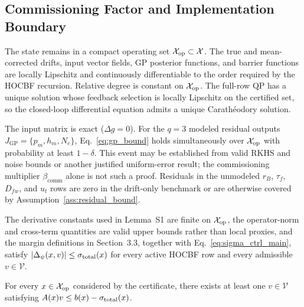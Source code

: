 \subsection{Commissioning Factor and Implementation Boundary}

\begin{assumption}
\label{ass:operating_set}
The state remains in a compact operating set $\mathcal{X}_{\mathrm{op}}\subset\mathcal{X}$. The true and mean-corrected drifts, input vector fields, GP posterior functions, and barrier functions are locally Lipschitz and continuously differentiable to the order required by the HOCBF recursion. Relative degree is constant on $\mathcal{X}_{\mathrm{op}}$. The full-row QP has a unique solution whose feedback selection is locally Lipschitz on the certified set, so the closed-loop differential equation admits a unique Carath\'{e}odory solution.
\end{assumption}

\begin{assumption}
\label{ass:gp_event}
The input matrix is exact ($\Delta g=0$). For the $q=3$ modeled residual outputs $J_{\mathrm{GP}}=\{p_m,h_m,N_e\}$, Eq.~\eqref{eq:gp_bound} holds simultaneously over $\mathcal{X}_{\mathrm{op}}$ with probability at least $1-\delta$. This event may be established from valid RKHS and noise bounds or another justified uniform-error result; the commissioning multiplier $\beta_{\mathrm{comm}}$ alone is not such a proof. Residuals in the unmodeled $r_B$, $\tau_f$, $D_{fw}$, and $u_t$ rows are zero in the drift-only benchmark or are otherwise covered by Assumption~\ref{ass:residual_bound}.
\end{assumption}

\begin{assumption}
\label{ass:residual_bound}
The derivative constants used in Lemma~S1 are finite on $\mathcal{X}_{\mathrm{op}}$, the operator-norm and cross-term quantities are valid upper bounds rather than local proxies, and the margin definitions in Section~3.3, together with Eq.~\eqref{eq:sigma_ctrl_main}, satisfy $|\Delta_{\psi}(x,v)|\leq\sigma_{\mathrm{total}}(x)$ for every active HOCBF row and every admissible $v\in\mathcal{V}$.
\end{assumption}

\begin{assumption}
\label{ass:qp_feasible}
For every $x\in\mathcal{X}_{\mathrm{op}}$ considered by the certificate, there exists at least one $v\in\mathcal{V}$ satisfying $A(x)v\leq b(x)-\sigma_{\mathrm{total}}(x)$.
\end{assumption}

